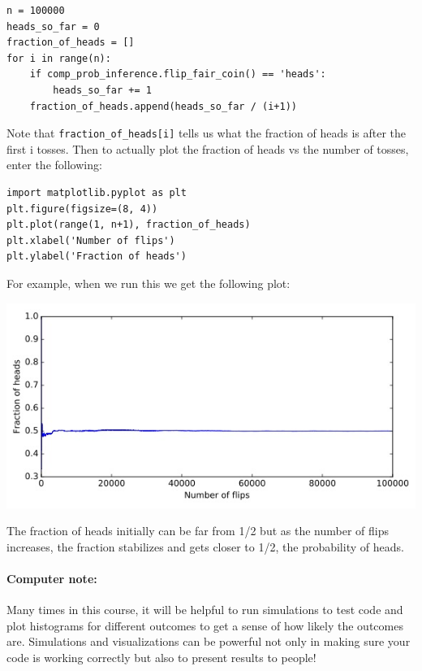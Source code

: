 \documentclass[6008notes.tex]{subfiles}
\begin{document}
\begin{lstlisting}
n = 100000
heads_so_far = 0
fraction_of_heads = []
for i in range(n):
    if comp_prob_inference.flip_fair_coin() == 'heads':
        heads_so_far += 1
    fraction_of_heads.append(heads_so_far / (i+1))
\end{lstlisting}
Note that \texttt{fraction\_of\_heads[i]} tells us what the fraction of heads is after the first i tosses. Then to actually plot the fraction of heads vs the number of tosses, enter the following:

\begin{lstlisting}
import matplotlib.pyplot as plt
plt.figure(figsize=(8, 4))
plt.plot(range(1, n+1), fraction_of_heads)
plt.xlabel('Number of flips')
plt.ylabel('Fraction of heads')
\end{lstlisting}

For example, when we run this we get the following plot:

{\centering\includegraphics[scale=0.5]{images_sec-intro-frequency-of-heads-vs-number-of-flips} \par}

The fraction of heads initially can be far from 1/2 but as the number of flips increases, the fraction stabilizes and gets closer to 1/2, the probability of heads.

\paragraph{Computer note:} Many times in this course, it will be helpful to run simulations to test code and plot histograms for different outcomes to get a sense of how likely the outcomes are. Simulations and visualizations can be powerful not only in making sure your code is working correctly but also to present results to people!
\end{document}
